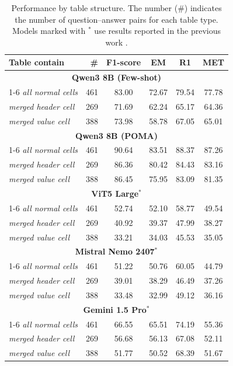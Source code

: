 \documentclass[]{interact}
\begin{document}
\begin{table}[!t]
\small
\centering
\caption{Performance by table structure. The number (\#) indicates the number of question--answer pairs for each table type. Models marked with $^{*}$ use results reported in the previous work \citep{openvitabqa2025}.}
\label{tab:table-structure-analysis}
\begin{tabular*}{0.9\textwidth}{@{\extracolsep{\fill}}l r c c c c}
\toprule
\textbf{Table contain} & \textbf{\#} & \textbf{F1-score} & \textbf{EM} & \textbf{R1} & \textbf{MET} \\
\midrule
\multicolumn{6}{c}{\textbf{Qwen3 8B (Few-shot)}} \\
\cmidrule(lr){1-6}
\textit{all normal cells}    & 461 & 83.00 & 72.67 & 79.54 & 77.78 \\
\textit{merged header cell}  & 269 & 71.69 & 62.24 & 65.17 & 64.36 \\
\textit{merged value cell}   & 388 & 73.98 & 58.78 & 67.05 & 65.01 \\
\midrule
\multicolumn{6}{c}{\textbf{Qwen3 8B (POMA)}} \\
\cmidrule(lr){1-6}
\textit{all normal cells}    & 461 & 90.64 & 83.51 & 88.37 & 87.26 \\
\textit{merged header cell}  & 269 & 86.36 & 80.42 & 84.43 & 83.16 \\
\textit{merged value cell}   & 388 & 86.45 & 75.95 & 83.09 & 81.35 \\
\midrule
\multicolumn{6}{c}{\textbf{ViT5 Large$^{*}$}} \\
\cmidrule(lr){1-6}
\textit{all normal cells}    & 461 & 52.74 & 52.10 & 58.77 & 49.54 \\
\textit{merged header cell}  & 269 & 40.92 & 39.37 & 47.99 & 38.27 \\
\textit{merged value cell}   & 388 & 33.21 & 34.03 & 45.53 & 35.05 \\
\midrule
\multicolumn{6}{c}{\textbf{Mistral Nemo 2407$^{*}$}} \\
\cmidrule(lr){1-6}
\textit{all normal cells}    & 461 & 51.22 & 50.76 & 60.05 & 44.79 \\
\textit{merged header cell}  & 269 & 39.01 & 38.29 & 46.49 & 37.26 \\
\textit{merged value cell}   & 388 & 33.48 & 32.99 & 49.12 & 36.16 \\
\midrule
\multicolumn{6}{c}{\textbf{Gemini 1.5 Pro$^{*}$}} \\
\cmidrule(lr){1-6}
\textit{all normal cells}    & 461 & 66.55 & 65.51 & 74.19 & 55.36 \\
\textit{merged header cell}  & 269 & 56.68 & 56.13 & 67.08 & 52.11 \\
\textit{merged value cell}   & 388 & 51.77 & 50.52 & 68.39 & 51.67 \\
\bottomrule
\end{tabular*}
\end{table}
\end{document}
